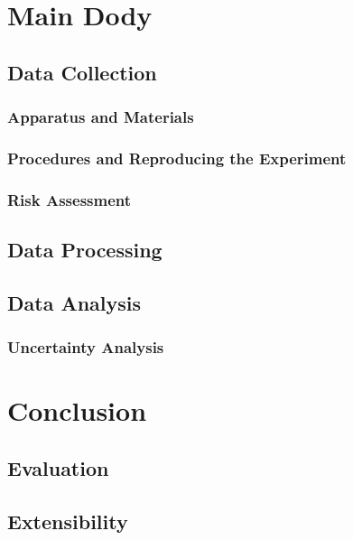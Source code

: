 \documentclass[a4paper,12pt]{article}
\begin{document}
\section{Main Dody}

\subsection{Data Collection}

\subsubsection{Apparatus and Materials}

\subsubsection{Procedures and Reproducing the Experiment}

\subsubsection{Risk Assessment}

\subsection{Data Processing}

\subsection{Data Analysis}

\subsubsection{Uncertainty Analysis}

\section{Conclusion}

\subsection{Evaluation}

\subsection{Extensibility}

\pagebreak

\end{document}
